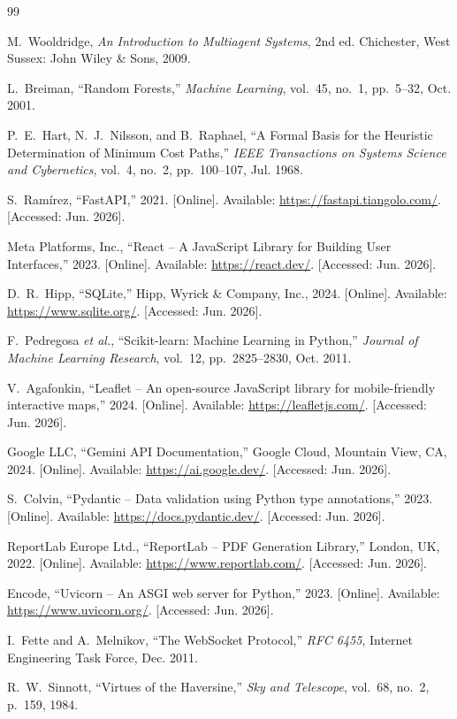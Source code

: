 \documentclass[12pt,a4paper]{report}
\begin{document}
\begin{thebibliography}{99}

M.~Wooldridge, \textit{An Introduction to Multiagent Systems}, 2nd ed. Chichester, West Sussex: John Wiley \& Sons, 2009.

L.~Breiman, ``Random Forests,'' \textit{Machine Learning}, vol.~45, no.~1, pp.~5--32, Oct. 2001.

P.~E.~Hart, N.~J.~Nilsson, and B.~Raphael, ``A Formal Basis for the Heuristic Determination of Minimum Cost Paths,'' \textit{IEEE Transactions on Systems Science and Cybernetics}, vol.~4, no.~2, pp.~100--107, Jul. 1968.

S.~Ram\'{i}rez, ``FastAPI,'' 2021. [Online]. Available: \url{https://fastapi.tiangolo.com/}. [Accessed: Jun. 2026].

Meta Platforms, Inc., ``React -- A JavaScript Library for Building User Interfaces,'' 2023. [Online]. Available: \url{https://react.dev/}. [Accessed: Jun. 2026].

D.~R.~Hipp, ``SQLite,'' Hipp, Wyrick \& Company, Inc., 2024. [Online]. Available: \url{https://www.sqlite.org/}. [Accessed: Jun. 2026].

F.~Pedregosa \textit{et al.}, ``Scikit-learn: Machine Learning in Python,'' \textit{Journal of Machine Learning Research}, vol.~12, pp.~2825--2830, Oct. 2011.

V.~Agafonkin, ``Leaflet -- An open-source JavaScript library for mobile-friendly interactive maps,'' 2024. [Online]. Available: \url{https://leafletjs.com/}. [Accessed: Jun. 2026].

Google LLC, ``Gemini API Documentation,'' Google Cloud, Mountain View, CA, 2024. [Online]. Available: \url{https://ai.google.dev/}. [Accessed: Jun. 2026].

S.~Colvin, ``Pydantic -- Data validation using Python type annotations,'' 2023. [Online]. Available: \url{https://docs.pydantic.dev/}. [Accessed: Jun. 2026].

ReportLab Europe Ltd., ``ReportLab -- PDF Generation Library,'' London, UK, 2022. [Online]. Available: \url{https://www.reportlab.com/}. [Accessed: Jun. 2026].

Encode, ``Uvicorn -- An ASGI web server for Python,'' 2023. [Online]. Available: \url{https://www.uvicorn.org/}. [Accessed: Jun. 2026].

I.~Fette and A.~Melnikov, ``The WebSocket Protocol,'' \textit{RFC 6455}, Internet Engineering Task Force, Dec. 2011.

R.~W.~Sinnott, ``Virtues of the Haversine,'' \textit{Sky and Telescope}, vol.~68, no.~2, p.~159, 1984.

\end{thebibliography}


\end{document}
